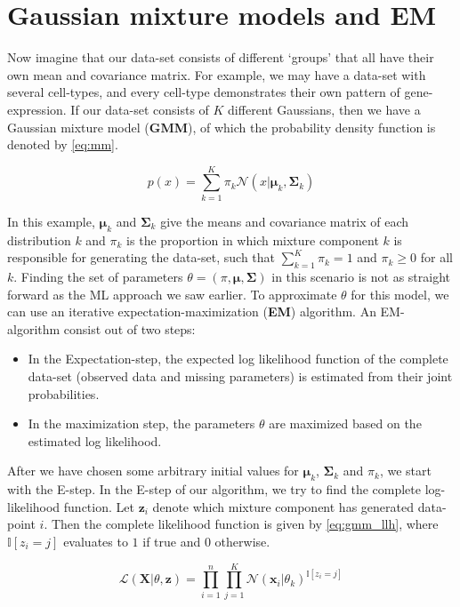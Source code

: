 \section{Gaussian mixture models and EM}
Now imagine that our data-set consists of different `groups' that all have their own mean and covariance matrix. For example, we may have a data-set with several cell-types, and every cell-type demonstrates their own pattern of gene-expression. If our data-set consists of $K$ different Gaussians, then we have a Gaussian mixture model (\textbf{GMM}), of which the probability density function is denoted by \ref{eq:mm}.

\begin{equation}\label{eq:mm}
    p(x) = \sum_{k=1}^K \pi_k \mathcal{N}(x|\bm{\mu}_k, \bm{\Sigma}_k)
\end{equation}

In this example, $\bm{\mu}_k$ and $\bm{\Sigma}_k$ give the means and covariance matrix of each distribution $k$ and $\pi_k$ is the proportion in which mixture component $k$ is responsible for generating the data-set, such that $\sum^K_{k=1}\pi_k = 1$ and $\pi_k\geq0$ for all $k$.
 Finding the set of parameters $\theta = (\pi, \bm{\mu}, \bm{\Sigma})$ in this scenario is not as straight forward as the ML approach we saw earlier. To approximate $\theta$ for this model, we can use an iterative expectation-maximization (\textbf{EM}) algorithm. An EM-algorithm consist out of two steps:
 
 \begin{itemize}
     \item In the Expectation-step, the expected log likelihood function of the complete data-set (observed data and missing parameters) is estimated from their joint probabilities.
     \item In the maximization step, the parameters $\theta$ are maximized based on the estimated log likelihood.
 \end{itemize}

 After we have chosen some arbitrary initial values for $\bm{\mu}_k$, $\bm{\Sigma}_k$ and $\pi_k$, we start with the E-step. In the E-step of our algorithm, we try to find the complete log-likelihood function. Let $\bm{z}_i$ denote which mixture component has generated data-point $i$. Then the complete likelihood function is given by \ref{eq:gmm_llh}, where $\mathbb{I}[z_i=j]$ evaluates to $1$ if true and $0$ otherwise. 

\begin{equation}\label{eq:gmm_llh}
    \mathcal{L}(\bm{X}|\theta, \bm{z}) = \prod^n_{i=1} \prod^K_{j=1} \mathcal{N}(\bm{x}_i|\theta_k)^{\mathbb{I}[z_i=j]}
\end{equation}

